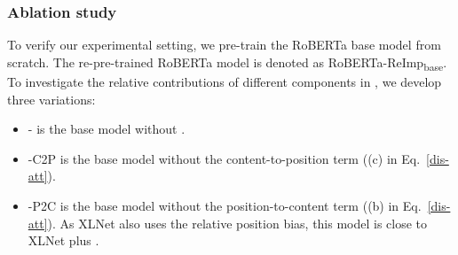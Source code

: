 \subsubsection{Ablation study}
\label{subsec:abs}
To verify our experimental setting, we pre-train the RoBERTa base model from scratch.  
The re-pre-trained RoBERTa model is denoted as RoBERTa-ReImp\textsubscript{base}. 
To investigate the relative contributions of different components in {\ModelName}, we develop three variations:
\begin{itemize}
    \item {-\DecoderName} is the {\ModelName} base model without \DecoderName.
    \item {-C2P} is the  {\ModelName} base model without the content-to-position term ((c) in Eq.~\ref{dis-att}).
    \item {-P2C} is the {\ModelName} base model without the position-to-content term ((b) in Eq.~\ref{dis-att}). As XLNet also uses the relative position bias, this model is close to XLNet plus \DecoderName.
\end{itemize}
